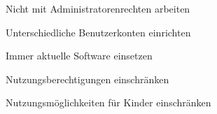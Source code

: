 \item Nicht mit Administratorenrechten arbeiten
\item Unterschiedliche Benutzerkonten einrichten
\item Immer aktuelle Software einsetzen
\item Nutzungsberechtigungen einschränken
\item Nutzungsmöglichkeiten für Kinder einschränken

